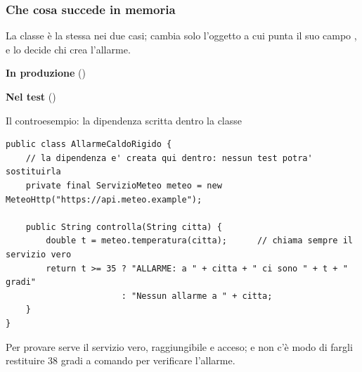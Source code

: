 \subsubsection*{Che cosa succede in memoria}

La classe  è la stessa nei due casi; cambia solo l'oggetto a cui punta il suo campo , e lo
decide chi crea l'allarme.

\noindent\begin{minipage}[t]{0.49\textwidth}
\centering
{\small\textbf{In produzione} ()\par}
\medskip
{}
\end{minipage}\hfill
\begin{minipage}[t]{0.49\textwidth}
\centering
{\small\textbf{Nel test} ()\par}
\medskip
{}
\end{minipage}

\begin{esempio}{Il controesempio: la dipendenza scritta dentro la classe}
\begin{lstlisting}[style=java, name=AllarmeCaldoRigido.java]
public class AllarmeCaldoRigido {
    // la dipendenza e' creata qui dentro: nessun test potra' sostituirla
    private final ServizioMeteo meteo = new MeteoHttp("https://api.meteo.example");

    public String controlla(String citta) {
        double t = meteo.temperatura(citta);      // chiama sempre il servizio vero
        return t >= 35 ? "ALLARME: a " + citta + " ci sono " + t + " gradi"
                       : "Nessun allarme a " + citta;
    }
}
\end{lstlisting}
Per provare  serve il servizio vero, raggiungibile e acceso; e non c'è modo di fargli restituire
38 gradi a comando per verificare l'allarme.
\end{esempio}

